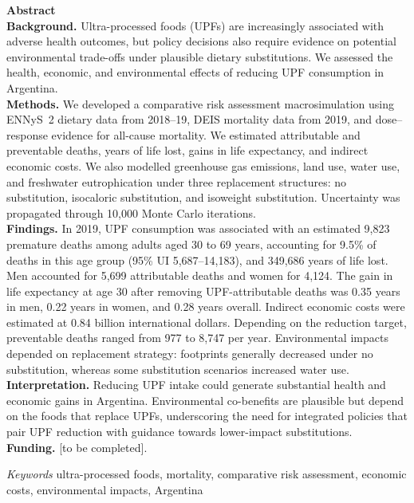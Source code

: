 ﻿\documentclass{article}
\begin{document}
\begin{center}
\begin{minipage}{0.80\textwidth}
\noindent \textbf{\large{Abstract}} \\

\noindent \textbf{Background.} Ultra-processed foods (UPFs) are increasingly associated with adverse health outcomes, but policy decisions also require evidence on potential environmental trade-offs under plausible dietary substitutions. We assessed the health, economic, and environmental effects of reducing UPF consumption in Argentina. \\

\textbf{Methods.} We developed a comparative risk assessment macrosimulation using ENNyS~2 dietary data from 2018--19, DEIS mortality data from 2019, and dose--response evidence for all-cause mortality. We estimated attributable and preventable deaths, years of life lost, gains in life expectancy, and indirect economic costs. We also modelled greenhouse gas emissions, land use, water use, and freshwater eutrophication under three replacement structures: no substitution, isocaloric substitution, and isoweight substitution. Uncertainty was propagated through 10,000 Monte Carlo iterations.\\

\textbf{Findings.} In 2019, UPF consumption was associated with an estimated 9,823 premature deaths among adults aged 30 to 69 years, accounting for 9.5\% of deaths in this age group (95\% UI 5,687--14,183), and 349,686 years of life lost. Men accounted for 5,699 attributable deaths and women for 4,124. The gain in life expectancy at age 30 after removing UPF-attributable deaths was 0.35 years in men, 0.22 years in women, and 0.28 years overall. Indirect economic costs were estimated at 0.84 billion international dollars. Depending on the reduction target, preventable deaths ranged from 977 to 8,747 per year. Environmental impacts depended on replacement strategy: footprints generally decreased under no substitution, whereas some substitution scenarios increased water use.\\

\textbf{Interpretation.} Reducing UPF intake could generate substantial health and economic gains in Argentina. Environmental co-benefits are plausible but depend on the foods that replace UPFs, underscoring the need for integrated policies that pair UPF reduction with guidance towards lower-impact substitutions. \\
\textbf{Funding.} [to be completed].

\vspace{0.5cm}
\noindent \textit{Keywords} ultra-processed foods, mortality, comparative risk assessment, economic costs, environmental impacts, Argentina \\
\end{minipage}
\end{center}
\end{document}
